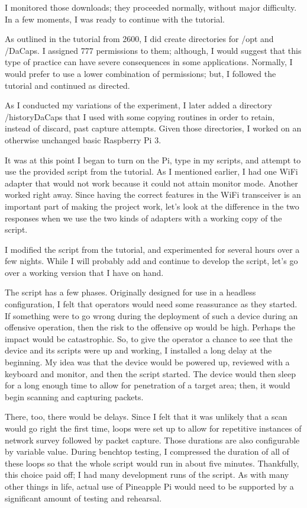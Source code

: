 I monitored those downloads; they proceeded normally, without major difficulty.  In a few moments, I was ready to continue with the tutorial.

As outlined in the tutorial from 2600, I did create directories for /opt and /DaCaps.  I assigned 777 permissions to them; although, I would suggest that this type of practice can have severe consequences in some applications.  Normally, I would prefer to use a lower combination of permissions; but, I followed the tutorial and continued as directed.

As I conducted my variations of the experiment, I later added a directory /historyDaCaps that I used with some copying routines in order to retain, instead of discard, past capture attempts.  Given those directories, I worked on an otherwise unchanged basic Raspberry Pi 3.

It was at this point I began to turn on the Pi, type in my scripts, and attempt to use the provided script from the tutorial.  As I mentioned earlier, I had one WiFi adapter that would not work because it could not attain monitor mode.  Another worked right away.  Since having the correct features in the WiFi transceiver is an important part of making the project work, let's look at the difference in the two responses when we use the two kinds of adapters with a working copy of the script.

I modified the script from the tutorial, and experimented for several hours over a few nights.  While I will probably add and continue to develop the script, let's go over a working version that I have on hand.

The script has a few phases.  Originally designed for use in a headless \gls{configuration}, I felt that operators would need some reassurance as they started.  If something were to go wrong during the deployment of such a device during an offensive operation, then the risk to the offensive op would be high.  Perhaps the impact would be catastrophic.  So, to give the operator a chance to see that the device and its scripts were up and working, I installed a long delay at the beginning.  My idea was that the device would be powered up, reviewed with a keyboard and monitor, and then the script started.  The device would then sleep for a long enough time to allow for penetration of a target area; then, it would begin scanning and capturing packets.

There, too, there would be delays.  Since I felt that it was unlikely that a scan would go right the first time, loops were set up to allow for repetitive instances of network survey followed by packet capture.  Those durations are also configurable by variable value.  During benchtop testing, I compressed the duration of all of these loops so that the whole script would run in about five minutes.  Thankfully, this choice paid off; I had many development runs of the script.  As with many other things in life, actual use of Pineapple Pi would need to be supported by a significant amount of testing and rehearsal.

